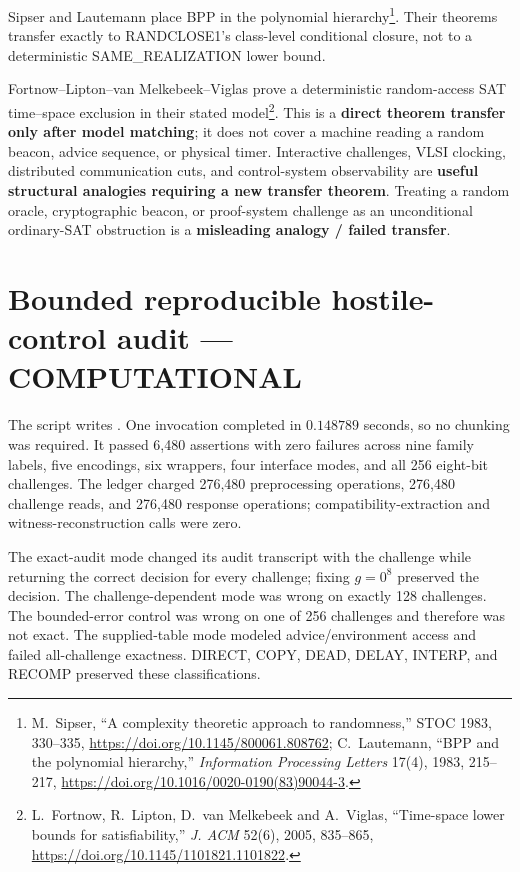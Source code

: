 \documentclass[11pt]{article}
\newcommand{\COMP}{\textbf{COMPUTATIONAL}}
\begin{document}
Sipser and Lautemann place BPP in the polynomial hierarchy\footnote{M.~Sipser,
``A complexity theoretic approach to randomness,'' STOC 1983, 330--335,
\url{https://doi.org/10.1145/800061.808762}; C.~Lautemann, ``BPP and the
polynomial hierarchy,'' \emph{Information Processing Letters} 17(4), 1983,
215--217, \url{https://doi.org/10.1016/0020-0190(83)90044-3}.}.  Their
theorems transfer exactly to RANDCLOSE1's class-level conditional closure,
not to a deterministic SAME\_REALIZATION lower bound.

Fortnow--Lipton--van Melkebeek--Viglas prove a deterministic random-access
SAT time--space exclusion in their stated model\footnote{L.~Fortnow,
R.~Lipton, D.~van Melkebeek and A.~Viglas, ``Time-space lower bounds for
satisfiability,'' \emph{J. ACM} 52(6), 2005, 835--865,
\url{https://doi.org/10.1145/1101821.1101822}.}.  This is a
\textbf{direct theorem transfer only after model matching}; it does not cover
a machine reading a random beacon, advice sequence, or physical timer.
Interactive challenges, VLSI clocking, distributed communication cuts, and
control-system observability are \textbf{useful structural analogies requiring
a new transfer theorem}.  Treating a random oracle, cryptographic beacon, or
proof-system challenge as an unconditional ordinary-SAT obstruction is a
\textbf{misleading analogy / failed transfer}.

\section{Bounded reproducible hostile-control audit --- \COMP}

The script
writes
.
One invocation completed in $0.148789$ seconds, so no chunking was required.
It passed 6,480 assertions with zero failures across nine family labels, five
encodings, six wrappers, four interface modes, and all 256 eight-bit
challenges.  The ledger charged 276,480 preprocessing operations, 276,480
challenge reads, and 276,480 response operations; compatibility-extraction
and witness-reconstruction calls were zero.

The exact-audit mode changed its audit transcript with the challenge while
returning the correct decision for every challenge; fixing $g=0^8$ preserved
the decision.  The challenge-dependent mode was wrong on exactly 128
challenges.  The bounded-error control was wrong on one of 256 challenges and
therefore was not exact.  The supplied-table mode modeled advice/environment
access and failed all-challenge exactness.  DIRECT, COPY, DEAD, DELAY, INTERP,
and RECOMP preserved these classifications.
\end{document}
